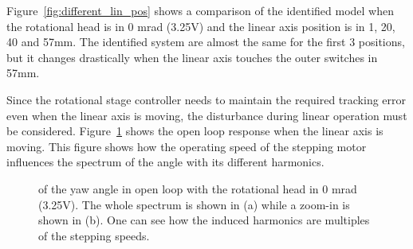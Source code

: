 Figure~\ref{fig:different_lin_pos} shows a comparison of the identified model when the rotational head is in 0 mrad (3.25V) and the linear axis position is in 1, 20, 40 and 57mm. The identified system are almost the same for the first 3 positions, but it changes drastically when the linear axis touches the outer switches in 57mm.

Since the rotational stage controller needs to maintain the required tracking error even when the linear axis is moving, the disturbance during linear operation must be considered. Figure~\ref{fig:dist_diff_speed} shows the open loop response when the linear axis is moving. This figure shows how the operating speed of the stepping motor influences the spectrum of the angle with its different harmonics.

\begin{figure}[h!]
  \centering %
  \qquad
  \caption{\label{fig:dist_diff_speed} \abbrFFT of the yaw angle in open loop with the rotational head in 0 mrad (3.25V). The whole spectrum is shown in (a) while a zoom-in is shown in (b). One can see how the induced harmonics are multiples of the stepping speeds.}
\end{figure}

